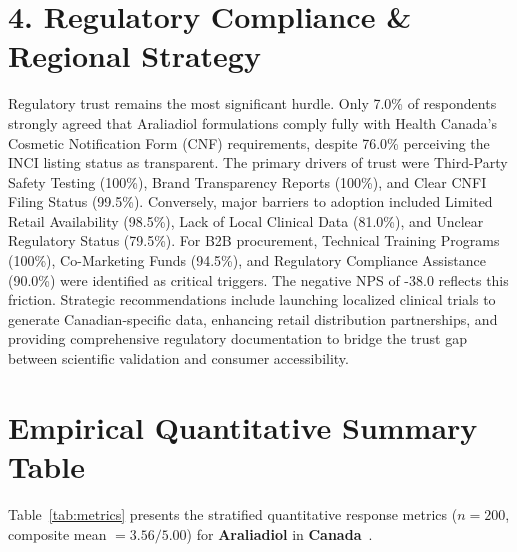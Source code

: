 \documentclass[10pt,twocolumn,a4paper]{article}
\begin{document}
\section{4. Regulatory Compliance \& Regional Strategy}
Regulatory trust remains the most significant hurdle. Only 7.0\% of respondents strongly agreed that Araliadiol formulations comply fully with Health Canada's Cosmetic Notification Form (CNF) requirements, despite 76.0\% perceiving the INCI listing status as transparent. The primary drivers of trust were Third-Party Safety Testing (100\%), Brand Transparency Reports (100\%), and Clear CNFI Filing Status (99.5\%). Conversely, major barriers to adoption included Limited Retail Availability (98.5\%), Lack of Local Clinical Data (81.0\%), and Unclear Regulatory Status (79.5\%). For B2B procurement, Technical Training Programs (100\%), Co-Marketing Funds (94.5\%), and Regulatory Compliance Assistance (90.0\%) were identified as critical triggers. The negative NPS of -38.0 reflects this friction. Strategic recommendations include launching localized clinical trials to generate Canadian-specific data, enhancing retail distribution partnerships, and providing comprehensive regulatory documentation to bridge the trust gap between scientific validation and consumer accessibility.


\section{Empirical Quantitative Summary Table}
Table~\ref{tab:metrics} presents the stratified quantitative response metrics ($n = 200$, composite mean $= 3.56/5.00$) for \textbf{Araliadiol} in \textbf{Canada}~\cite{ref_kaggle_doi,ref_hf_doi}.
\end{document}
